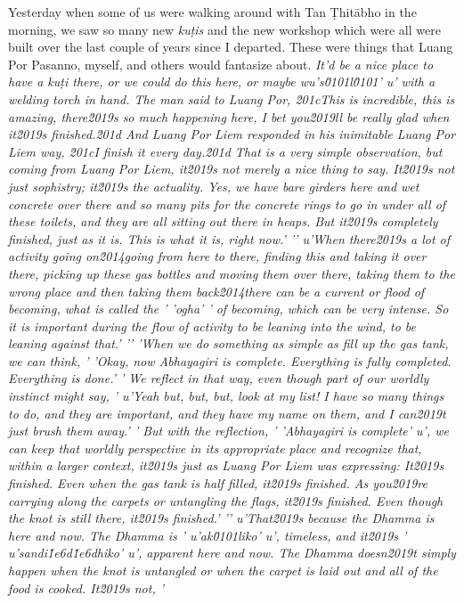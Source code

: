 Yesterday when some of us were walking around with Tan Ṭhitābho in 
the morning, we saw so many new \emph{kuṭis} and the new workshop 
which were all were built over the last couple of years since I 
departed. These were things that Luang Por Pasanno, myself, and others 
would fantasize about. \emph{It'd be a nice place to have a kuṭi 
there, or we could do this here, or maybe wu's\u0101l\u0101'
u' with a welding torch in hand. The man said to Luang Por, \u201cThis is incredible, this is amazing, there\u2019s so much happening here, I bet you\u2019ll be really glad when it\u2019s finished.\u201d And Luang Por Liem responded in his inimitable Luang Por Liem way, \u201cI finish it every day.\u201d That is a very simple observation, but coming from Luang Por Liem, it\u2019s not merely a nice thing to say. It\u2019s not just sophistry; it\u2019s the actuality. Yes, we have bare girders here and wet concrete over there and so many pits for the concrete rings to go in under all of these toilets, and they are all sitting out there in heaps. But it\u2019s completely finished, just as it is. This is what it is, right now.'
'\n'
u'When there\u2019s a lot of activity going on\u2014going from here to there, finding this and taking it over there, picking up these gas bottles and moving them over there, taking them to the wrong place and then taking them back\u2014there can be a current or flood of becoming, what is called the '
'ogha'
' of becoming, which can be very intense. So it is important during the flow of activity to be leaning into the wind, to be leaning against that.'
'\n'
'When we do something as simple as fill up the gas tank, we can think, '
'Okay, now Abhayagiri is complete. Everything is fully completed. Everything is done.'
' We reflect in that way, even though part of our worldly instinct might say, '
u'Yeah but, but, but, look at my list! I have so many things to do, and they are important, and they have my name on them, and I can\u2019t just brush them away.'
' But with the reflection, '
'Abhayagiri is complete'
u', we can keep that worldly perspective in its appropriate place and recognize that, within a larger context, it\u2019s just as Luang Por Liem was expressing: It\u2019s finished. Even when the gas tank is half filled, it\u2019s finished. As you\u2019re carrying along the carpets or untangling the flags, it\u2019s finished. Even though the knot is still there, it\u2019s finished.'
'\n'
u'That\u2019s because the Dhamma is here and now. The Dhamma is '
u'ak\u0101liko'
u', timeless, and it\u2019s '
u'sandi\u1e6d\u1e6dhiko'
u', apparent here and now. The Dhamma doesn\u2019t simply happen when the knot is untangled or when the carpet is laid out and all of the food is cooked. It\u2019s not, '
}
